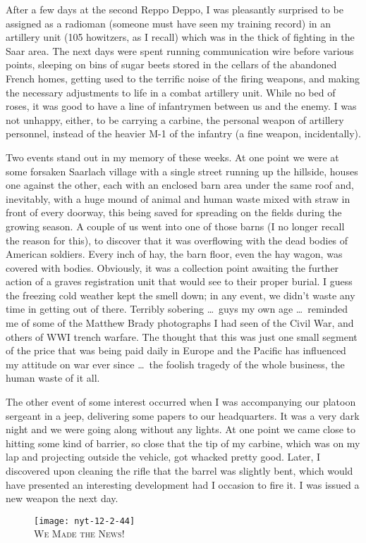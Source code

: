 \documentclass[../m3y]{subfiles}
\begin{document}
After a few days at the second Reppo Deppo, I was pleasantly surprised to be assigned as a radioman (someone must have seen my training record) in an artillery unit (105 howitzers, as I recall) which was in the thick of fighting in the Saar area. The next days were spent running communication wire before various points, sleeping on bins of sugar beets stored in the cellars of the abandoned French homes, getting used to the terrific noise of the firing weapons, and making the necessary adjustments to life in a combat artillery unit. While no bed of roses, it was good to have a line of infantrymen between us and the enemy. I was not unhappy, either, to be carrying a carbine, the personal weapon of artillery personnel, instead of the heavier M-1 of the infantry (a fine weapon, incidentally).

Two events stand out in my memory of these weeks. At one point we were at some forsaken Saarlach village with a single street running up the hillside, houses one against the other, each with an enclosed barn area under the same roof and, inevitably, with a huge mound of animal and human waste mixed with straw in front of every doorway, this being saved for spreading on the fields during the growing season. A couple of us went into one of those barns (I no longer recall the reason for this), to discover that it was overflowing with the dead bodies of American soldiers. Every inch of hay, the barn floor, even the hay wagon, was covered with bodies. Obviously, it was a collection point awaiting the further action of a graves registration unit that would see to their proper burial. I guess the freezing cold weather kept the smell down; in any event, we didn't waste any time in getting out of there. Terribly sobering \ldots\ guys my own age \ldots\ reminded me of some of the Matthew Brady photographs I had seen of the Civil War, and others of WW\thinspace I trench warfare. The thought that this was just one small segment of the price that was being paid daily in Europe and the Pacific has influenced my attitude on war ever since \ldots\ the foolish tragedy of the whole business, the human waste of it all.

The other event of some interest occurred when I was accompanying our platoon sergeant in a jeep, delivering some papers to our headquarters. It was a very dark night and we were going along without any lights. At one point we came close to hitting some kind of barrier, so close that the tip of my carbine, which was on my lap and projecting outside the vehicle, got whacked pretty good. Later, I discovered upon cleaning the rifle that the barrel was slightly bent, which would have presented an interesting development had I occasion to fire it. I was issued a new weapon the next day.

\medskip
\begin{figure}[h]
\centering
\texttt{[image: nyt-12-2-44]}\\
\medskip
{\newtimes\textsc{We Made the News!}}
\end{figure}
\end{document}
